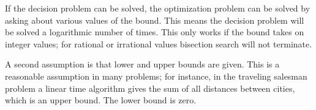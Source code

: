 If the decision problem can be solved, the optimization problem can be
solved by asking about various values of the bound. This means the
decision problem will be solved a logarithmic number of times.
This only works if the bound takes on integer values; for rational or
irrational values bisection search will not terminate.

A second assumption is that lower and upper bounds are given. This is
a reasonable assumption in many problems; for instance, in the
traveling salesman problem a linear time algorithm gives the sum of
all distances between cities, which is an upper bound. The lower bound
is zero.
